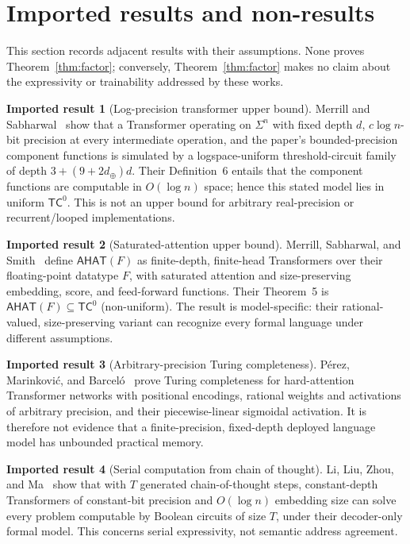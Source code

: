 \documentclass[11pt]{article}
\theoremstyle{definition}
\newtheorem{imported}{Imported result}
\theoremstyle{plain}
\begin{document}
\section{Imported results and non-results}\label{sec:imports}

This section records adjacent results with their assumptions.  None proves
Theorem~\ref{thm:factor}; conversely, Theorem~\ref{thm:factor} makes no claim
about the expressivity or trainability addressed by these works.

\begin{imported}[Log-precision transformer upper bound]
Merrill and Sabharwal~\citep{merrill2022parallelism} show that a Transformer
operating on \(\Sigma^n\) with fixed depth \(d\), \(c\log n\)-bit precision
at every intermediate operation, and the paper's bounded-precision component
functions is simulated by a logspace-uniform threshold-circuit family of
depth \(3+(9+2d_{\oplus})d\).  Their Definition~6 entails that the component
functions are computable in \(O(\log n)\) space; hence this stated model lies
in uniform \(\mathsf{TC}^0\).  This is not an upper bound for arbitrary
real-precision or recurrent/looped implementations.
\end{imported}

\begin{imported}[Saturated-attention upper bound]
Merrill, Sabharwal, and Smith~\citep{merrill2021saturated} define
\(\mathsf{AHAT}(F)\) as finite-depth, finite-head Transformers over their
floating-point datatype \(F\), with saturated attention and
size-preserving embedding, score, and feed-forward functions.  Their
Theorem~5 is \(\mathsf{AHAT}(F)\subseteq\mathsf{TC}^0\) (non-uniform).
The result is model-specific: their rational-valued, size-preserving variant
can recognize every formal language under different assumptions.
\end{imported}

\begin{imported}[Arbitrary-precision Turing completeness]
P\'erez, Marinkovi\'c, and Barcel\'o~\citep{perez2021turing} prove Turing
completeness for hard-attention Transformer networks with positional
encodings, rational weights and activations of arbitrary precision, and their
piecewise-linear sigmoidal activation.  It is therefore not evidence that a
finite-precision, fixed-depth deployed language model has unbounded practical
memory.
\end{imported}

\begin{imported}[Serial computation from chain of thought]
Li, Liu, Zhou, and Ma~\citep{li2024cot} show that with \(T\) generated
chain-of-thought steps, constant-depth Transformers of constant-bit precision
and \(O(\log n)\) embedding size can solve every problem computable by Boolean
circuits of size \(T\), under their decoder-only formal model.  This concerns
serial expressivity, not semantic address agreement.
\end{imported}
\end{document}
